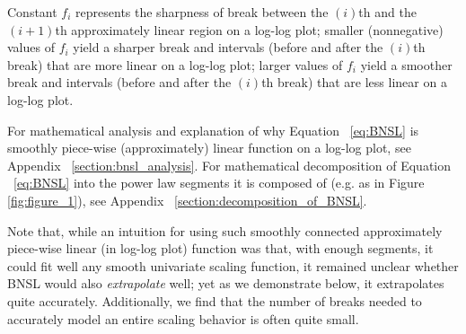 \documentclass{article} %
\begin{document}
Constant $f_i$ represents the sharpness of break between the $(i)$th and the $(i+1)$th approximately linear region on a log-log plot; smaller (nonnegative) values of $f_i$ yield a sharper break and intervals (before and after the $(i)$th break) that are more linear on a log-log plot; larger values of $f_i$ yield a smoother break and intervals (before and after the $(i)$th break) that are less linear on a log-log plot.

\vspace{-1.2mm}

For mathematical analysis and explanation of why Equation ~\ref{eq:BNSL} is smoothly piece-wise (approximately) linear function on a log-log plot, see Appendix ~\ref{section:bnsl_analysis}. For mathematical decomposition of Equation ~\ref{eq:BNSL} into the power law segments it is composed of (e.g. as in Figure \ref{fig:figure_1}), see Appendix ~\ref{section:decomposition_of_BNSL}.

\vspace{-0.5mm}

Note that, while an intuition for using such smoothly connected approximately piece-wise linear (in log-log plot) function was that, with enough segments, it could fit well any smooth univariate scaling function, it remained unclear whether BNSL would also {\em extrapolate} well; yet as we demonstrate below, it extrapolates quite accurately. Additionally, we find that the number of breaks needed to accurately model an entire scaling behavior is often quite small.








\end{document}
